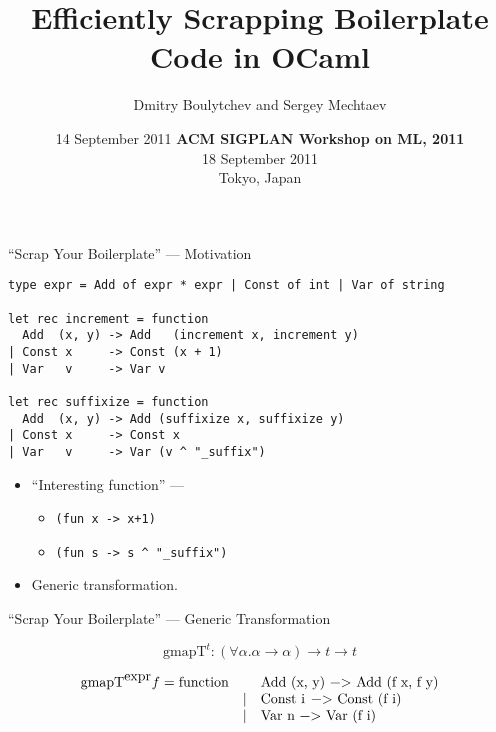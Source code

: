 

\title{Efficiently Scrapping Boilerplate Code in OCaml}

\author[Dmitry Boulytchev]{Dmitry Boulytchev and Sergey Mechtaev}
\date{14 September 2011}

\date{
   \textbf{ACM SIGPLAN Workshop on ML, 2011}\\
   18 September 2011 \\
   Tokyo, Japan
}



\begin{frame} 
  \titlepage
\end{frame}

\begin{frame}[fragile]{``Scrap Your Boilerplate'' --- Motivation}
\begin{lstlisting}
type expr = Add of expr * expr | Const of int | Var of string

let rec increment = function
  Add  (x, y) -> Add   (increment x, increment y)
| Const x     -> Const (x + 1)
| Var   v     -> Var v

let rec suffixize = function
  Add  (x, y) -> Add (suffixize x, suffixize y)
| Const x     -> Const x
| Var   v     -> Var (v ^ "_suffix")
\end{lstlisting}

\pause

\begin{itemize}
\item ``Interesting function'' --- 
  \begin{itemize}
     \item \lstinline{(fun x -> x+1)}
     \item \lstinline{(fun s -> s ^ "_suffix")}
  \end{itemize}
\pause
\item Generic transformation.
\end{itemize}

\end{frame}

\begin{frame}[fragile]{``Scrap Your Boilerplate'' --- Generic Transformation}

$$
\mbox{gmapT}^t : (\forall \alpha.\alpha\to\alpha)\to t\to t
$$
\pause

$$
\begin{array}{rcl}
  \mbox{gmapT}^{\mbox{expr}} f = \mbox{\lstinline{function}} &   & \mbox{\lstinline{Add (x, y) -> Add (f x, f y)}} \\
                                                          & | & \mbox{\lstinline{Const i -> Const (f i)}}   \\
                                                          & | & \mbox{\lstinline{Var n -> Var (f i)}}
\end{array}
$$
\end{frame}

